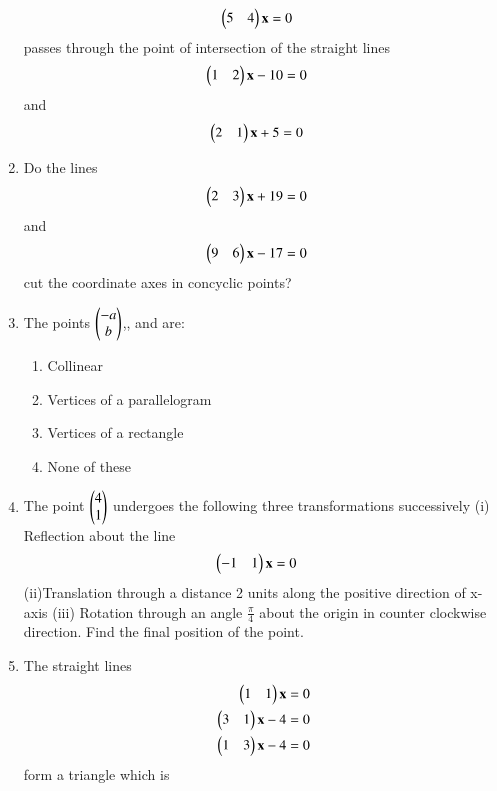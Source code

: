 \begin{enumerate}[label=\arabic*.,ref=\thesubsection.\theenumi]
\begin{align} 
    \begin{pmatrix}5 & 4\end{pmatrix}\mathbf{x} &= 0
    \end{align} passes through the point of intersection of the straight lines \begin{align} 
    \begin{pmatrix}1 & 2\end{pmatrix}\mathbf{x} - 10 &= 0
    \end{align} and \begin{align} 
    \begin{pmatrix}2 & 1\end{pmatrix}\mathbf{x} + 5 &= 0
    \end{align}
    \item Do the lines \begin{align} 
    \begin{pmatrix}2 & 3\end{pmatrix}\mathbf{x} + 19 &= 0
    \end{align} and \begin{align} 
    \begin{pmatrix}9 & 6\end{pmatrix}\mathbf{x} - 17 &= 0
    \end{align} cut the coordinate axes in concyclic points?
    \item The points $\begin{pmatrix}-a\\b\end{pmatrix}$,, and  are:
    \begin{enumerate}
    \item  Collinear
    \item  Vertices of a parallelogram
    \item  Vertices of a rectangle
    \item  None of these
    \end{enumerate}
    \item The point $\begin{pmatrix}4 \\ 1\end{pmatrix}$ undergoes the following three transformations successively
    (i) Reflection about the line \begin{align} 
    \begin{pmatrix}-1 & 1\end{pmatrix}\mathbf{x} &= 0
    \end{align}
    (ii)Translation through a distance 2 units along the positive direction of x-axis
    (iii) Rotation through an angle $\frac{\pi}{4}$ about the origin in counter clockwise direction.
    Find  the final position of the point.
\item The straight lines \begin{align} 
    \begin{pmatrix}1 & 1\end{pmatrix}\mathbf{x} &= 0
\\
    \begin{pmatrix}3 & 1\end{pmatrix}\mathbf{x} - 4 &= 0
\\
    \begin{pmatrix}1 & 3\end{pmatrix}\mathbf{x} - 4 &= 0
    \end{align}form a triangle which is
    \begin{enumerate}

\end{enumerate}
\end{enumerate}
